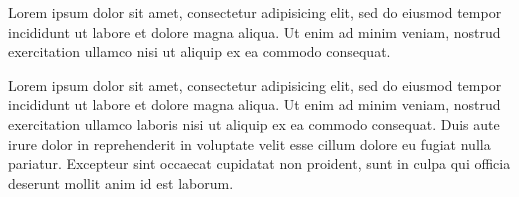 \documentclass{book}
\begin{document}
\begin{pages}


\begin{Leftside}
\beginnumbering
\pstart
\begin{ledgroup}

Lorem ipsum dolor sit amet, consectetur adipisicing elit, sed do eiusmod tempor incididunt ut labore et dolore magna aliqua. Ut enim ad minim veniam, nostrud exercitation ullamco  nisi ut aliquip ex ea commodo consequat. 

\end{ledgroup}
\pend

\endnumbering
\end{Leftside}

\begin{Rightside}
\beginnumbering

\pstart
\begin{ledgroup}

Lorem ipsum dolor sit amet, consectetur adipisicing elit, sed do eiusmod tempor incididunt ut labore et dolore magna aliqua. Ut enim ad minim veniam, nostrud exercitation ullamco laboris nisi ut aliquip ex ea commodo consequat. Duis aute irure dolor in reprehenderit in voluptate velit esse cillum dolore eu fugiat nulla pariatur. Excepteur sint occaecat cupidatat non proident, sunt in culpa qui officia deserunt mollit anim id est laborum.
\end{ledgroup}
\pend


\endnumbering
\end{Rightside}
\Pages
\end{pages}
\end{document}
